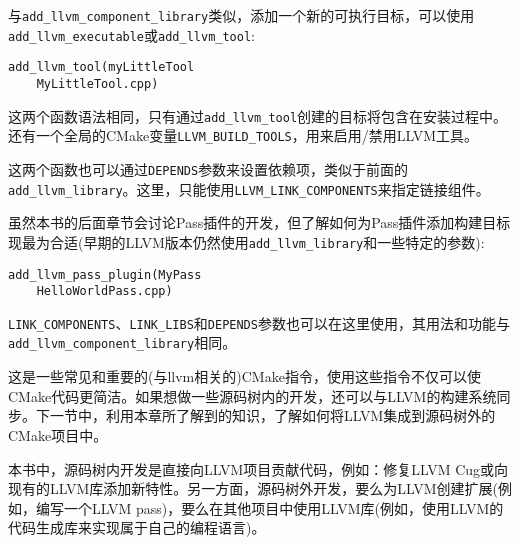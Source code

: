
与\texttt{add\_llvm\_component\_library}类似，添加一个新的可执行目标，可以使用\texttt{add\_llvm\_executable}或\texttt{add\_llvm\_tool}:

\begin{lstlisting}[style=styleCMake]
add_llvm_tool(myLittleTool
	MyLittleTool.cpp)
\end{lstlisting}

这两个函数语法相同，只有通过\texttt{add\_llvm\_tool}创建的目标将包含在安装过程中。还有一个全局的CMake变量\texttt{LLVM\_BUILD\_TOOLS}，用来启用/禁用LLVM工具。

这两个函数也可以通过\texttt{DEPENDS}参数来设置依赖项，类似于前面的\texttt{add\_llvm\_library}。这里，只能使用\texttt{LLVM\_LINK\_COMPONENTS}来指定链接组件。


虽然本书的后面章节会讨论Pass插件的开发，但了解如何为Pass插件添加构建目标现最为合适(早期的LLVM版本仍然使用\texttt{add\_llvm\_library}和一些特定的参数):

\begin{lstlisting}[style=styleCMake]
add_llvm_pass_plugin(MyPass
	HelloWorldPass.cpp)
\end{lstlisting}

\texttt{LINK\_COMPONENTS}、\texttt{LINK\_LIBS}和\texttt{DEPENDS}参数也可以在这里使用，其用法和功能与\\\texttt{add\_llvm\_component\_library}相同。

这是一些常见和重要的(与llvm相关的)CMake指令，使用这些指令不仅可以使CMake代码更简洁。如果想做一些源码树内的开发，还可以与LLVM的构建系统同步。下一节中，利用本章所了解到的知识，了解如何将LLVM集成到源码树外的CMake项目中。

\begin{tcolorbox}[colback=blue!5!white,colframe=blue!75!black, fonttitle=\bfseries,title=LLVM源码内/外的开发]
\hspace*{0.7cm}本书中，源码树内开发是直接向LLVM项目贡献代码，例如：修复LLVM Cug或向现有的LLVM库添加新特性。另一方面，源码树外开发，要么为LLVM创建扩展(例如，编写一个LLVM pass)，要么在其他项目中使用LLVM库(例如，使用LLVM的代码生成库来实现属于自己的编程语言)。
\end{tcolorbox}














